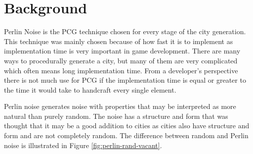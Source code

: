 	\section{Background}
	Perlin Noise is the PCG technique chosen for every stage of the city generation. This technique was mainly chosen because of how fast it is to implement as implementation time is very important in game development.
	There are many ways to procedurally generate a city, but many of them are very complicated which often means long implementation time. From a developer's perspective there is not much use for PCG if the implementation time is equal or greater to the time it would take to handcraft every single element.
	
	Perlin noise generates noise with properties that may be interpreted as more natural than purely random. The noise has a structure and form that was thought that it may be a good addition to cities as cities also have structure and form and are not completely random. The difference between random and Perlin noise is illustrated in Figure \ref{fig:perlin-rand-vacant}.
	
